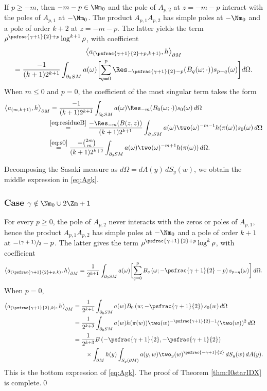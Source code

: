 If $p\ge -m$, then $-m-p\in \Nm_0$ and the pole of $A_{p,2}$ at $z = -m-p$ interact with the poles of $A_{p,1}$ at $-\Nm_0$. The product $A_{p,1} A_{p,2}$ has simple poles at $-\Nm_0$ and a pole of order $k+2$ at $z = -m-p$.
The latter yields the term $\rho^{\psfrac{\gamma+1}{2}+p} \log^{k+1} \rho$, with coefficient
\begin{multline*}
\left\langle a_{(\psfrac{\gamma+1}{2}+p, k+1)}, h\right\rangle_{\partial M}\\
= \frac{-1}{(k+1) 2^{k+1}} \int_{\partial_0 SM} a(\omega) \biggl[\sum_{q=0}^p \Res_{- \psfrac{\gamma+1}{2} - p} (B_q(\omega; \cdot)) s_{p-q}(\omega) \biggr] d\Omega.
\end{multline*}
When $m\le 0$ and $p=0$, the coefficient of the most singular term takes the form
\begin{align*}
\left\langle a_{(m, k+1)}, h\right\rangle_{\partial M} &= \frac{-1}{(k+1) 2^{k+1}} \int_{\partial_0 SM} a(\omega) \Res_{-m}(B_0(\omega; \cdot)) s_{0}(\omega)\,d\Omega \\
&\!\!\stackrel{\eqref{eq:residueB}}{=} \frac{-\Res_{-m}(B(z,z))}{(k+1) 2^{k+1}} \int_{\partial_0 SM} a(\omega) \two(\omega)^{-m-1} h(\pi(\omega)) s_{0}(\omega)\,d\Omega \\
&\!\!\stackrel{\eqref{eq:s0}}{=} \frac{-\binom{2m}{m}}{(k+1) 2^{k+2}} \int_{\partial_0 SM} a(\omega) \two(\omega)^{-m+1} h(\pi(\omega))\,d\Omega.
\end{align*}

Decomposing the Sasaki measure as $d\Omega = dA(y)\,dS_y(w)$, we obtain the middle expression in \eqref{eq:Agk}.

\subsubsection*{Case $\gamma\notin \Nm_0\cup 2\Zm +1$}
For every $p\ge 0$, the pole of $A_{p,2}$ never interacts with the zeros or poles of $A_{p,1}$, hence the product $A_{p,1} A_{p,2}$ has simple poles at $-\Nm_0$ and a pole of order $k+1$ at
$-\sfrac{(\gamma+1)}{2}-p$. The latter gives the term $\rho^{\psfrac{\gamma+1}{2}+p} \log^{k} \rho$, with coefficient
\[
\left\langle a_{(\psfrac{\gamma+1}{2}+p,k)}, h\right\rangle_{\partial M} = \frac{1}{2^{k+1}} \int_{\partial_0 SM} a(\omega) \biggl[\sum_{q=0}^{p} B_q\left(\omega; -\psfrac{\gamma+1}{2}-p\right) s_{p-q}(\omega) \biggr]\,d\Omega.
\]
When $p=0$,
\begin{align*}
\left\langle a_{(\psfrac{\gamma+1}{2},k)}, h \right\rangle_{\partial M} &= \frac{1}{2^{k+1}} \int_{\partial_0 SM} a(w) B_0 \left(w; -\psfrac{\gamma+1}{2}\right) s_0 (w)\,d\Omega \\
&= \frac{1}{2^{k+3}} \int_{\partial_0 SM} a(w) h(\pi(w)) \two(w)^{-\psfrac{\gamma+1}{2}-1} (\two(w))^2\,d\Omega \\
&= \frac{1}{2^{k+3}} B\left(-\psfrac{\gamma+1}{2}, -\psfrac{\gamma+1}{2} \right) \\
& \qquad \times \int_{\partial M} h(y) \int_{S_y (\partial M)} a(y,w) \two_y(w)^{\psfrac{-\gamma+1}{2}}\,dS_y(w)\,dA(y).
\end{align*}
This is the bottom expression of \eqref{eq:Agk}. The proof of Theorem \ref{thm:I0starIDX} is complete.\qed

